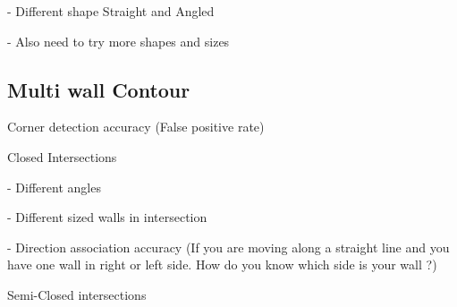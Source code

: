   - Different shape Straight and Angled
 
   - Also need to try more shapes and sizes

\subsection{Multi wall Contour}

  Corner detection accuracy (False positive rate)
  
  Closed Intersections
   
  - Different angles
 
  - Different sized walls in intersection
  
  - Direction association accuracy (If you are moving along a straight line and you have one wall in right or left side. How do you know which side is your wall ?)
  
  Semi-Closed intersections
  
\begin{figure}[h!t]
\end{figure}

